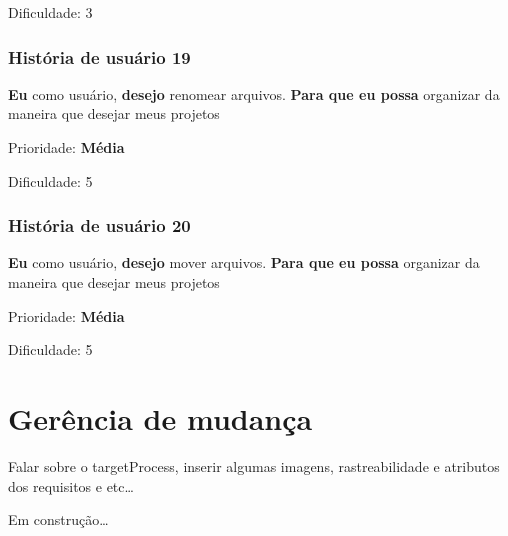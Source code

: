     Dificuldade: 3

  \subsubsection{História de usuário 19}
    \textbf{Eu} como usuário, \textbf{desejo} renomear arquivos. \textbf{Para que eu possa} organizar da maneira que desejar meus projetos

    Prioridade: \textbf{Média}

    Dificuldade: 5

  \subsubsection{História de usuário 20}
    \textbf{Eu} como usuário, \textbf{desejo} mover arquivos. \textbf{Para que eu possa} organizar da maneira que desejar meus projetos

    Prioridade: \textbf{Média}

    Dificuldade: 5



\section{Gerência de mudança}

  Falar sobre o targetProcess, inserir algumas imagens, rastreabilidade e atributos dos requisitos e etc\ldots

  Em construção\ldots

